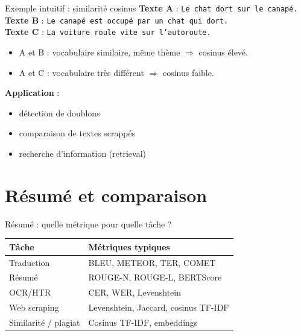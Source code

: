 \documentclass[10pt]{beamer}
\begin{document}
\begin{frame}{Exemple intuitif : similarité cosinus}
  \textbf{Texte A} : \texttt{Le chat dort sur le canapé.} \\
  \textbf{Texte B} : \texttt{Le canapé est occupé par un chat qui dort.} \\
  \textbf{Texte C} : \texttt{La voiture roule vite sur l'autoroute.}

  \vspace{0.3cm}
  \begin{itemize}
    \item A et B : vocabulaire similaire, même thème $\Rightarrow$ cosinus élevé.
    \item A et C : vocabulaire très différent $\Rightarrow$ cosinus faible.
  \end{itemize}

  \vspace{0.3cm}
  \textbf{Application} :
  \begin{itemize}
    \item détection de doublons
    \item comparaison de textes scrappés
    \item recherche d'information (retrieval)
  \end{itemize}
\end{frame}

\section{Résumé et comparaison}

\begin{frame}{Résumé : quelle métrique pour quelle tâche ?}
  \begin{center}
  \begin{tabular}{ll}
    \toprule
    Tâche & Métriques typiques \\
    \midrule
    Traduction & BLEU, METEOR, TER, COMET \\
    Résumé & ROUGE-N, ROUGE-L, BERTScore \\
    OCR/HTR & CER, WER, Levenshtein \\
    Web scraping & Levenshtein, Jaccard, cosinus TF-IDF \\
    Similarité / plagiat & Cosinus TF-IDF, embeddings \\
    \bottomrule
  \end{tabular}
  \end{center}
\end{frame}
\end{document}
